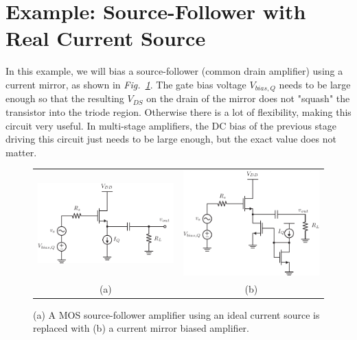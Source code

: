 \section{Example:  Source-Follower with Real Current Source}
In this example, we will bias a source-follower (common drain amplifier) using a current mirror, as shown in \emph{Fig.~\ref{fig:cd_amp_dc}}.  The gate bias voltage $V_{bias,Q}$ needs to be large enough so that the resulting $V_{DS}$ on the drain of the mirror does not "squash" the transistor into the triode region.  Otherwise there is a lot of flexibility, making this circuit very useful.  In multi-stage amplifiers, the DC bias of the previous stage driving this circuit just needs to be large enough, but the exact value does not matter.
\begin{figure}[tb]
\centering
\begin{tabular}{cc}
\includegraphics[scale=.8]{cd_amp_dc} &
\includegraphics[scale=.8]{cd_amp_dc_mirror}\\
(a) & (b)\\
\end{tabular}
\caption{(a) A MOS source-follower amplifier using an ideal current source is replaced with (b) a current mirror biased amplifier.}
\label{fig:cd_amp_dc}
\end{figure}
